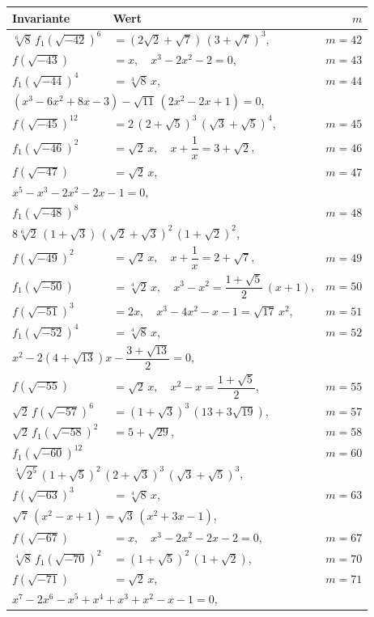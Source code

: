 \documentclass[12pt,a4paper]{article}
\begin{document}
\newpage
\setcounter{page}{723}

\begin{longtable}{@{}llr@{}}
\toprule
\multicolumn{1}{l}{\textbf{Invariante}} & \multicolumn{1}{l}{\textbf{Wert}} & $m$ \\
\midrule
\endhead
$\sqrt[6]{8}\,f_1(\sqrt{-42})^6$ &$= (2\sqrt{2}+\sqrt{7})\,(3+\sqrt{7})^3$, & $m=42$ \\
$f(\sqrt{-43})$ &$= x,\quad x^3-2x^2-2=0$, & $m=43$ \\
$f_1(\sqrt{-44})^4$ &$= \sqrt[4]{8}\,x$, & $m=44$ \\
\multicolumn{3}{l}{\qquad$(x^3-6x^2+8x-3)-\sqrt{11}\,(2x^2-2x+1)=0$,} \\
$f(\sqrt{-45})^{12}$ &$= 2\,(2+\sqrt{5})^3\,(\sqrt{3}+\sqrt{5})^4$, & $m=45$ \\
$f_1(\sqrt{-46})^2$ &$= \sqrt{2}\,x,\quad x+\dfrac{1}{x}=3+\sqrt{2}$, & $m=46$ \\
$f(\sqrt{-47})$ &$= \sqrt{2}\,x$, & $m=47$ \\
\multicolumn{3}{l}{\qquad$x^5-x^3-2x^2-2x-1=0$,} \\
$f_1(\sqrt{-48})^8$ & & $m=48$ \\
\multicolumn{3}{l}{\qquad$8\sqrt[6]{2}\,(1+\sqrt{3})\,(\sqrt{2}+\sqrt{3})^2\,(1+\sqrt{2})^2$,} \\
$f(\sqrt{-49})^2$ &$= \sqrt{2}\,x,\quad x+\dfrac{1}{x}=2+\sqrt{7}$, & $m=49$ \\
$f_1(\sqrt{-50})$ &$= \sqrt[4]{2}\,x,\quad x^3-x^2=\dfrac{1+\sqrt{5}}{2}\,(x+1)$, & $m=50$ \\
$f(\sqrt{-51})^3$ &$= 2x,\quad x^3-4x^2-x-1=\sqrt{17}\,x^2$, & $m=51$ \\
$f_1(\sqrt{-52})^4$ &$= \sqrt[4]{8}\,x$, & $m=52$ \\
\multicolumn{3}{l}{\qquad$x^2-2(4+\sqrt{13})x-\dfrac{3+\sqrt{13}}{2}=0$,} \\
\midrule
$f(\sqrt{-55})$ &$= \sqrt{2}\,x,\quad x^2-x=\dfrac{1+\sqrt{5}}{2}$, & $m=55$ \\
$\sqrt{2}\,f(\sqrt{-57})^6$ &$= (1+\sqrt{3})^3\,(13+3\sqrt{19})$, & $m=57$ \\
$\sqrt{2}\,f_1(\sqrt{-58})^2$ &$= 5+\sqrt{29}$, & $m=58$ \\
$f_1(\sqrt{-60})^{12}$ & & $m=60$ \\
\multicolumn{3}{l}{\qquad$\sqrt[4]{2^5}\,(1+\sqrt{5})^2\,(2+\sqrt{3})^3\,(\sqrt{3}+\sqrt{5})^3$,} \\
$f(\sqrt{-63})^3$ &$= \sqrt[4]{8}\,x$, & $m=63$ \\
\multicolumn{3}{l}{\qquad$\sqrt{7}\,(x^2-x+1)=\sqrt{3}\,(x^2+3x-1)$,} \\
$f(\sqrt{-67})$ &$= x,\quad x^3-2x^2-2x-2=0$, & $m=67$ \\
$\sqrt[4]{8}\,f_1(\sqrt{-70})^2$ &$= (1+\sqrt{5})^2\,(1+\sqrt{2})$, & $m=70$ \\
$f(\sqrt{-71})$ &$= \sqrt{2}\,x$, & $m=71$ \\
\multicolumn{3}{l}{\qquad$x^7-2x^6-x^5+x^4+x^3+x^2-x-1=0$,} \\
\bottomrule
\end{longtable}
\end{document}
